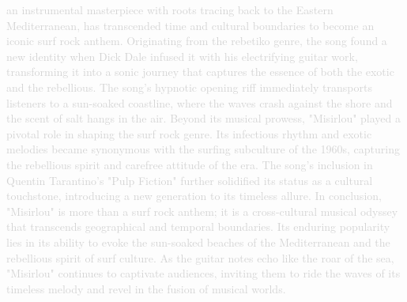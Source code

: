 \textcolor{lightgray}{an instrumental masterpiece with roots tracing back to the Eastern Mediterranean, has transcended time and cultural boundaries to become an iconic surf rock anthem. Originating from the rebetiko genre, the song found a new identity when Dick Dale infused it with his electrifying guitar work, transforming it into a sonic journey that captures the essence of both the exotic and the rebellious.
The song's hypnotic opening riff immediately transports listeners to a sun-soaked coastline, where the waves crash against the shore and the scent of salt hangs in the air. 
Beyond its musical prowess, "Misirlou" played a pivotal role in shaping the surf rock genre. Its infectious rhythm and exotic melodies became synonymous with the surfing subculture of the 1960s, capturing the rebellious spirit and carefree attitude of the era. The song's inclusion in Quentin Tarantino's "Pulp Fiction" further solidified its status as a cultural touchstone, introducing a new generation to its timeless allure.
In conclusion, "Misirlou" is more than a surf rock anthem; it is a cross-cultural musical odyssey that transcends geographical and temporal boundaries. Its enduring popularity lies in its ability to evoke the sun-soaked beaches of the Mediterranean and the rebellious spirit of surf culture. As the guitar notes echo like the roar of the sea, "Misirlou" continues to captivate audiences, inviting them to ride the waves of its timeless melody and revel in the fusion of musical worlds.}\\

